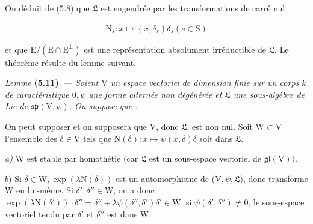 \documentclass[10pt,leqno]{article}
\begin{document}
\noindent On déduit de (5.8) que \(\mathfrak{L} \) est engendrée par les transformations de carré nul\par

\begin{equation*}\begin{gathered}\mathrm{N}_{s} : x \longmapsto  (x,\delta _{s})\delta _{s}    (s\in \mathrm{S})\end{gathered}\end{equation*}

\noindent et que \(\mathrm{E}/(\mathrm{E}\cap \mathrm{E}^{\perp })\) est une représentation absolument irréductible de \(\mathfrak{L} \). Le théorème résulte du lemme suivant.\par

\noindent \emph{Lemme} \textbf{(5.11)}. — {\itshape Soient \(\mathrm{V}\) un espace vectoriel de dimension finie sur un corps \(k\) de caractéristique \(0, \psi \) une forme alternée non dégénérée et \(\mathfrak{L} \) une sous-algèbre de Lie de \(\mathfrak{sp}(\mathrm{V},\psi )\). On suppose que :}\par

\par

\par

\par

\noindent On peut supposer et on supposera que \(\mathrm{V}\), donc \(\mathfrak{L} \), est non nul. Soit \(\mathrm{W}\subset \mathrm{V}\) l’ensemble des \(\delta \in \mathrm{V}\) tels que \(\mathrm{N}(\delta ):x\longmapsto \psi (x,\delta )\delta \) soit dans \(\mathfrak{L} \).\par

\noindent \emph{a)} \(\mathrm{W}\) est stable par homothétie (car \(\mathfrak{L} \) est un sous-espace vectoriel de \(\mathfrak{gl}(\mathrm{V}))\).\par

\noindent \(b)\) Si \(\delta \in \mathrm{W}, \operatorname{exp}(\lambda \mathrm{N}(\delta ))\) est un automorphisme de (\(\mathrm{V},\psi ,\mathfrak{L} )\), donc transforme \(\mathrm{W}\) en lui-même. Si \(\delta ',\delta ''\in \mathrm{W}\), on a donc \(\operatorname{exp}(\lambda \mathrm{N}(\delta '))\cdot \delta ''=\delta ''+\lambda \psi (\delta '',\delta ')\delta '\in \mathrm{W}\); si \(\psi (\delta ',\delta '')\ne 0\), le sous-espace vectoriel tendu par \(\delta '\) et \(\delta ''\) est dans \(\mathrm{W}\).\par
\end{document}
